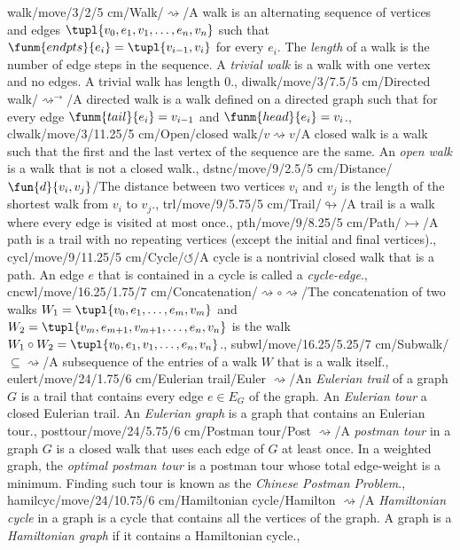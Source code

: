 walk/move/3/2/5 cm/{Walk}/{$\rightsquigarrow$}/{A walk is an alternating sequence of vertices and edges $\tupl{v_0,e_1,v_1,\ldots,e_n,v_n}$ such that $\funm{endpts}{e_i}=\tupl{v_{i-1},v_i}$ for every $e_i$. The \emph{length} of a walk is the number of edge steps in the sequence. A \emph{trivial walk} is a walk with one vertex and no edges. A trivial walk has length $0$.},%
diwalk/move/3/7.5/5 cm/{Directed walk}/{$\rightsquigarrow^{\rightarrow}$}/{A directed walk is a walk defined on a directed graph such that for every edge $\funm{tail}{e_i}=v_{i-1}$ and $\funm{head}{e_i}=v_i$.},
clwalk/move/3/11.25/5 cm/{Open/closed walk}/{$v\rightsquigarrow v$}/{A closed walk is a walk such that the first and the last vertex of the sequence are the same. An \emph{open walk} is a walk that is not a closed walk.},
dstnc/move/9/2.5/5 cm/{Distance}/{$\fun{d}{v_i,v_j}$}/{The distance between two vertices $v_i$ and $v_j$ is the length of the shortest walk from $v_i$ to $v_j$.},
trl/move/9/5.75/5 cm/{Trail}/{$\looparrowright$}/{A trail is a walk where every edge is visited at most once.},%
pth/move/9/8.25/5 cm/{Path}/{$\rightarrowtail$}/{A path is a trail with no repeating vertices (except the initial and final vertices).},%
cycl/move/9/11.25/5 cm/{Cycle}/{$\circlearrowleft$}/{A cycle is a nontrivial closed walk that is a path. An edge $e$ that is contained in a cycle is called a \emph{cycle-edge}.},%
cncwl/move/16.25/1.75/7 cm/{Concatenation}/{$\rightsquigarrow\circ\rightsquigarrow$}/{The concatenation of two walks $W_1=\tupl{v_0,e_1,\ldots,e_m,v_m}$ and $W_2=\tupl{v_m,e_{m+1},v_{m+1},\ldots,e_n,v_n}$ is the walk $W_1\circ W_2=\tupl{v_0,e_1,v_1,\ldots,e_n,v_n}$.},
subwl/move/16.25/5.25/7 cm/{Subwalk}/{$\subseteq\rightsquigarrow$}/{A subsequence of the entries of a walk $W$ that is a walk itself.},
eulert/move/24/1.75/6 cm/{Eulerian trail}/{Euler $\rightsquigarrow$}/{An \emph{Eulerian trail} of a graph $G$ is a trail that contains every edge $e\in E_G$ of the graph. An \emph{Eulerian tour} a closed Eulerian trail. An \emph{Eulerian graph} is a graph that contains an Eulerian tour.},%
posttour/move/24/5.75/6 cm/{Postman tour}/{Post $\rightsquigarrow$}/{A \emph{postman tour} in a graph $G$ is a closed walk that uses each edge of $G$ at least once. In a weighted graph, the \emph{optimal postman tour} is a postman tour whose total edge-weight is a minimum. Finding such tour is known as the \emph{Chinese Postman Problem}.},%
hamilcyc/move/24/10.75/6 cm/{Hamiltonian cycle}/{Hamilton $\rightsquigarrow$}/{A \emph{Hamiltonian cycle} in a graph is a cycle that contains all the vertices of the graph. A graph is a \emph{Hamiltonian graph} if it contains a Hamiltonian cycle.},%
